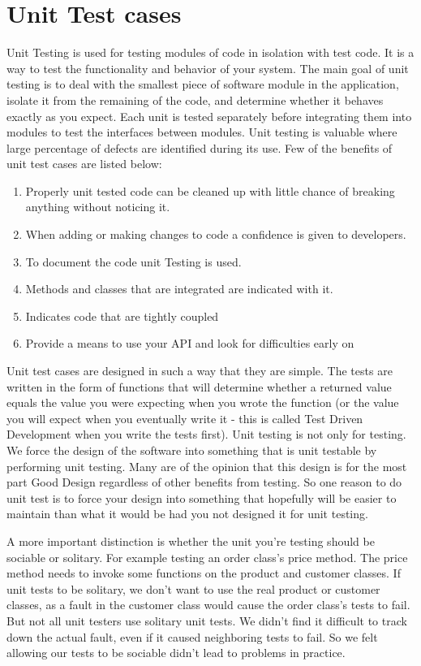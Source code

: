 \documentclass[article,type=msc,colorback,accentcolor=tud9c,twoside,11pt]{tudthesis}
\begin{document}
\section{Unit Test cases}
Unit Testing\cite{EffectivnessofUnitTest} is used for testing modules of code in isolation with test code. It is a way to test the functionality and behavior of your system. The main goal of unit testing is to deal with the smallest piece of software module in the application, isolate it from the remaining of the code, and determine whether it behaves exactly as you expect. Each unit is tested separately before integrating them into modules to test the interfaces between modules. Unit testing is valuable where large percentage of defects are identified during its use. Few of the benefits of unit test cases are listed below:
\begin{enumerate}
\item Properly unit tested code can be cleaned up with little chance of breaking anything without noticing it.
\item When adding or making changes to code a confidence is given to developers.
\item To document the code unit Testing is used.
\item Methods and classes that are integrated are indicated with it. 
\item Indicates code that are tightly coupled
\item Provide a means to use your API and look for difficulties early on 
\end{enumerate}
Unit test cases are designed in such a way that they are simple\cite{JMLandJUnit}. The tests are written in the form of functions that will determine whether a returned value equals the value you were expecting when you wrote the function (or the value you will expect when you eventually write it - this is called Test Driven Development when you write the tests first). Unit testing is not only for testing. We force the design of the software into something that is unit testable by performing unit testing. Many are of the opinion that this design is for the most part Good Design regardless of other benefits from testing. So one reason to do unit test is to force your design into something that hopefully will be easier to maintain than what it would be had you not designed it for unit testing.

A more important distinction is whether the unit you're testing should be sociable or solitary. For example testing an order class's price method. The price method needs to invoke some functions on the product and customer classes. If unit tests to be solitary, we don't want to use the real product or customer classes, as a fault in the customer class would cause the order class's tests to fail. But not all unit testers use solitary unit tests. We didn't find it difficult to track down the actual fault, even if it caused neighboring tests to fail. So we felt allowing our tests to be sociable didn't lead to problems in practice.
\end{document}
